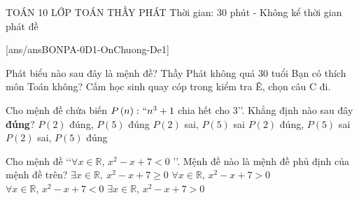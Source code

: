 
\begin{name}
	{\tenchude}
	{TOÁN 10}
	{LỚP TOÁN THẦY PHÁT}
	{Thời gian: 30 phút - Không kể thời gian phát đề}
\end{name}
\setcounter{page}{1}
\TN
{}[ans/ansBONPA-0D1-OnChuong-De1]
\begin{ex}%
Phát biểu nào sau đây là mệnh đề?
\choice
{\True Thầy Phát không quá 30 tuổi}
{Bạn có thích môn Toán không?}
{Cấm học sinh quay cóp trong kiểm tra}
{Ê, chọn câu C đi.}
\end{ex}

\begin{ex}%
Cho mệnh đề chứa biến $P\left(n\right)\colon \lq\lq n^3+1 $ chia hết cho $3$\rq\rq. Khẳng định nào sau đây \textbf{đúng}?
\choice
{\True$ P(2)$ đúng, $P(5)$ đúng}
{$P(2)$ sai, $P(5)$ sai}
{$P(2)$ đúng, $P(5)$ sai}
{$P(2)$ sai, $P(5)$ đúng}
\end{ex}

\begin{ex}%
Cho mệnh đề \lq\lq  $\forall x\in \mathbb{R},\, x^2-x+7 < 0$ \rq\rq . Mệnh đề nào là mệnh đề phủ định của mệnh đề trên?
\choice
{\True $\exists x\in \mathbb{R},\ x^2-x+7\ge 0$}
{$\forall x\in \mathbb{R},\, x^2-x+7>0$}
{$\forall x\in \mathbb{R},\, x^2-x+7 < 0$}
{$\exists x\in \mathbb{R},\, x^2-x+7 > 0$}
\loigiai{
}
\end{ex}

